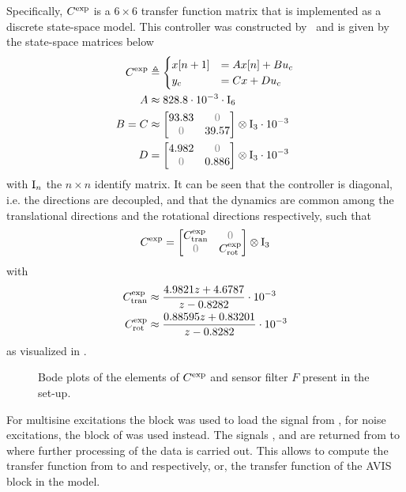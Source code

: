 Specifically, $C^{\mathrm{exp}}$ is a $6\times6$ transfer function matrix that is implemented as a discrete state-space model.
This controller was constructed by~\citet{Rademakers2005MSc}
 and is given by the state-space matrices below
\begin{align}
  \experimental\Controller & \isdef 
  \begin{cases}
     x[n+1] &= A x[n] + B u_c\\
       y_c    &= C x + D u_c 
  \end{cases}\\
  A       &\approx 828.8 \cdot 10^{-3} \cdot \Identity{6} \\
  B = C &\approx \AvisMatrixDiagonal{93.83}{39.57} \cdot 10^{-3}\\
  D       &= \AvisMatrixDiagonal{4.982}{0.886} \cdot 10^{-3}
\end{align}
with $\mathrm{I}_{n}$ the $n\times n$ identify matrix.
It can be seen that the controller is diagonal, i.e. the directions are decoupled, and that the dynamics are common among the translational directions and the rotational directions respectively, such that
\begin{equation}
  \experimental\Controller = 
  \AvisMatrixDiagonal{\experimental\Controller_{\mathrm{tran}}}{\experimental\Controller_{\mathrm{rot}}}
\end{equation}
with
\begin{align}
C^{\mathrm{exp}}_{\mathrm{tran}} &  \approx 
   \frac{4.9821 z + 4.6787}{ z - 0.8282} \cdot 10^{-3} \\
  C^{\mathrm{exp}}_{\mathrm{rot}} & \approx 
    \frac{0.88595 z + 0.83201}{ z - 0.8282} \cdot 10^{-3}
\end{align}
 as visualized in .

\begin{figure}[p]
\setlength{}
\setlength\figureheight{0.68\figurewidth}

\caption[ controller and filters]{Bode plots of the elements of $C^{\mathrm{exp}}$ and sensor filter $F$ present in the set-up.}
\label{fig:avis:bodeplots:controllerAndSensor}
\end{figure}

For multisine excitations the  block was used to load the  signal from \MATLAB, for noise excitations, the  block of \Simulink was used instead.
The signals ,  and  are returned from \Simulink to \MATLAB where further processing of the data is carried out.
This allows to compute the transfer function from  to  and  respectively, or, the transfer function of the \gls{AVIS} block in the \Simulink model.

